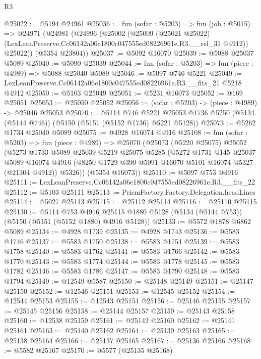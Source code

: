 \begin{lexlean}{R3}
\begin{coremodule}
@25022 := @5194 @24961
@25036 := fun (sofar : @5203) =>
  fun (job : @5015) =>
  @24971
    (@24981
      (@24996
        (@25002
          (@25009
            (@25021 @25022)
            (LexLeanPreserve.Cc06142a06e1800c047555ed08226961e.R3.__rel_31 @4912))
          @25022))
      (@5354 @23804))
@25037 := @5092 @16070
@25039 := @5088 @25037 @5089
@25040 := @5090 @25039
@25044 := fun (sofar : @5203) => fun (piece : @4989) => @5088 @25040 @5089
@25046 := @5097 @746 @5221
@25049 := LexLeanPreserve.Cc06142a06e1800c047555ed08226961e.R3.__fits_21 @5218 @4912
@25050 := @5103 @25049
@25051 := @5231 @16073
@25052 := @169 @25051
@25053 := @25050 @25052
@25056 := (sofar : @5203) -> (piece : @4989) -> @25046 @25053
@25070 := @5114
    @746
    @5221
    @25053
    @1736
    @5250
    (@5134 (@5144 @746))
    (@5150 (@5151 (@5152 @1736) @5221 @5128))
@25073 := @5262 @1734 @25040 @5089
@25075 := @4928 @16074 @4916
@25108 := fun (sofar : @5203) =>
  fun (piece : @4989) =>
  @25070
    (@25073
      (@5220 @25075)
      @25052
      (@5273
        @1733
        @5089
        @25039
        @5219
        @25075
        @5285
        (@5272
          @1731
          @145
          @25037
          @5089
          @16074
          @4916
          (@8250 @1729 @390 @5091 @16070 @5101 @16074 @5327 (@21304 @4912))
          @5326))
      (@5354 @16073))
@25110 := @5097 @753 @4916
@25111 := LexLeanPreserve.Cc06142a06e1800c047555ed08226961e.R3.__fits_22
@25112 := @5103 @25111
@25113 := PrismFactory.Factory.Delegation.headLines
@25114 := @5027 @25113
@25115 := @25112 @25114
@25116 := @25110 @25115
@25130 := @5114
    @753
    @4916
    @25115
    @1880
    @5128
    (@5134 (@5144 @753))
    (@5150 (@5151 (@5152 @1880) @4916 @5128))
@25133 := @5572 @1878 @6862 @5089
@25134 := @4928 @1739
@25135 := @4928 @1743
@25136 := @5583 @1746
@25137 := @5583 @1750
@25138 := @5583 @1754
@25139 := @5583 @1758
@25140 := @5583 @1762
@25141 := @5583 @1766
@25142 := @5583 @1770
@25143 := @5583 @1774
@25144 := @5583 @1778
@25145 := @5583 @1782
@25146 := @5583 @1786
@25147 := @5583 @1790
@25148 := @5583 @1794
@25149 := @12549 @5587
@25150 := @25148 @25149
@25151 := @25147 @25150
@25152 := @12546 @25151
@25153 := @12545 @25152
@25154 := @12544 @25153
@25155 := @12543 @25154
@25156 := @25146 @25155
@25157 := @25145 @25156
@25158 := @25144 @25157
@25159 := @25143 @25158
@25160 := @12538 @25159
@25161 := @25142 @25160
@25162 := @25141 @25161
@25163 := @25140 @25162
@25164 := @25139 @25163
@25165 := @25138 @25164
@25166 := @25137 @25165
@25167 := @25136 @25166
@25168 := @5582 @25167
@25170 := @5577 (@25135 @25168)

\end{coremodule}
\end{lexlean}
